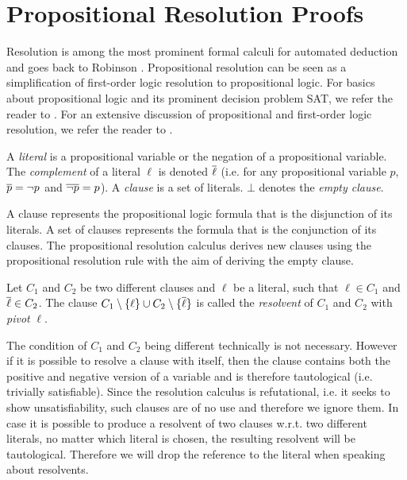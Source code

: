 \section{Propositional Resolution Proofs}
\label{sec:resolution}

Resolution is among the most prominent formal calculi for automated deduction and goes back to Robinson \cite{Robinson1965}.
Propositional resolution can be seen as a simplification of first-order logic resolution to propositional logic.
For basics about propositional logic and its prominent decision problem SAT, we refer the reader to \cite{Biere2009}.
For an extensive discussion of propositional and first-order logic resolution, we refer the reader to \cite{Leitsch1997}.

\begin{definition}

A \emph{literal} is a propositional variable or the negation of a propositional variable. 
The \emph{complement} of a literal $\ell$ is denoted $\overline{\ell}$ (i.e. for any propositional variable $p$,
$\overline{p} = \neg p$ and $\overline{\neg p} = p$). 
A \emph{clause} is a set of literals. 
$\bot$ denotes the \emph{empty clause}.

\end{definition}

A clause represents the propositional logic formula that is the disjunction of its literals.
A set of clauses represents the formula that is the conjunction of its clauses.
The propositional resolution calculus derives new clauses using the propositional resolution rule with the aim of deriving the empty clause.

\begin{definition}[Resolvent]
\label{def:resolvent}
Let $C_1$ and $C_2$ be two different clauses and $\ell$ be a literal, such that $\ell \in C_1$ and $\overline{\ell} \in C_2$.
The clause $C_1 \setminus \{\ell\} \cup C_2 \setminus \{\overline{\ell}\}$ is called the \emph{resolvent} of $C_1$ and $C_2$ with \emph{pivot} $\ell$.

\end{definition}

The condition of $C_1$ and $C_2$ being different technically is not necessary.
However if it is possible to resolve a clause with itself, then the clause contains both the positive and negative version of a variable and is therefore tautological (i.e. trivially satisfiable).
Since the resolution calculus is refutational, i.e. it seeks to show unsatisfiability, such clauses are of no use and therefore we ignore them.
In case it is possible to produce a resolvent of two clauses w.r.t. two different literals, no matter which literal is chosen, the resulting resolvent will be tautological.
Therefore we will drop the reference to the literal when speaking about resolvents.

